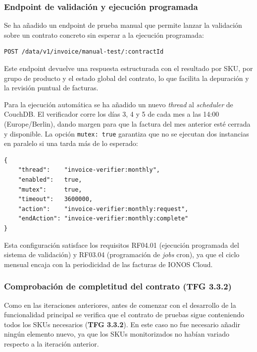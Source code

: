 \subsubsection{Endpoint de validación y ejecución programada}

Se ha añadido un endpoint de prueba manual que permite lanzar la validación sobre un contrato concreto sin esperar a la ejecución programada:

\begin{verbatim}
POST /data/v1/invoice/manual-test/:contractId
\end{verbatim}

Este endpoint devuelve una respuesta estructurada con el resultado por SKU, por grupo de producto y el estado global del contrato, lo que facilita la depuración y la revisión puntual de facturas.

Para la ejecución automática se ha añadido un nuevo \textit{thread} al \textit{scheduler} de CouchDB. El verificador corre los días 3, 4 y 5 de cada mes a las 14:00 (Europe/Berlin), dando margen para que la factura del mes anterior esté cerrada y disponible. La opción \texttt{mutex: true} garantiza que no se ejecutan dos instancias en paralelo si una tarda más de lo esperado:

\begin{lstlisting}[caption=Configuración del scheduler para validación de facturas, label=lst:scheduler-invoice]
{
    "thread":    "invoice-verifier:monthly",
    "enabled":   true,
    "mutex":     true,
    "timeout":   3600000,
    "action":    "invoice-verifier:monthly:request",
    "endAction": "invoice-verifier:monthly:complete"
}
\end{lstlisting}

Esta configuración satisface los requisitos RF04.01 (ejecución programada del sistema de validación) y RF03.04 (programación de \textit{jobs} cron), ya que el ciclo mensual encaja con la periodicidad de las facturas de IONOS Cloud.

\subsubsection{Comprobación de completitud del contrato (TFG 3.3.2)}

Como en las iteraciones anteriores, antes de comenzar con el desarrollo de la funcionalidad principal se verifica que el contrato de pruebas sigue conteniendo todos los SKUs necesarios (\textbf{TFG 3.3.2}). En este caso no fue necesario añadir ningún elemento nuevo, ya que los SKUs monitorizados no habían variado respecto a la iteración anterior.

